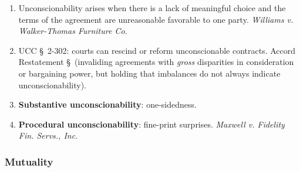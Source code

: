 \begin{enumerate}
    \item Unconscionability arises when there is a lack of meaningful choice 
    and the terms of the agreement are unreasonable favorable to one party. 
    \emph{Williams v. Walker-Thomas Furniture Co.}
    \item UCC \S\ 2-302: courts can rescind or reform unconscionable 
    contracts. Accord Restatement \S\ (invaliding agreements with \emph{gross} 
    disparities in consideration or bargaining power, but holding that 
    imbalances do not always indicate unconscionability).
    \item \textbf{Substantive unconscionability}: one-sidedness.
    \item \textbf{Procedural unconscionability}: fine-print surprises.  
    \emph{Maxwell v. Fidelity Fin. Servs., Inc.}
\end{enumerate}

\subsubsection{Mutuality}

